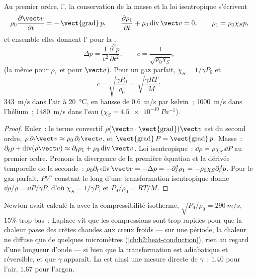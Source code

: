 \begin{theorem}\label{thm:b2:sound-waves:equation}
Au premier ordre, l', la conservation de la masse et la loi
isentropique s'écrivent
\[
\rho_0\frac{\partial\vect v}{\partial t} = -\operatorname{\vect{grad}}p , \qquad
\frac{\partial\rho_1}{\partial t} + \rho_0\operatorname{div}\vect v = 0 , \qquad
\rho_1 = \rho_0\chi_Sp ,
\]
et ensemble elles donnent l' pour la ,
\[
\Delta p = \frac1{c^2}\frac{\partial^2p}{\partial t^2} , \qquad
c = \frac1{\sqrt{\rho_0\chi_S}} ,
\]
(la même pour $\rho_1$ et pour $\vect v$). Pour un gaz parfait, $\chi_S =
1/\gamma P_0$ et
\[
c = \sqrt{\frac{\gamma P_0}{\rho_0}} = \sqrt{\frac{\gamma RT}{M}} :
\]
\qty{343}{m/s} dans l'air à \qty{20}{\degreeCelsius}, en hausse de \qty{0.6}{m/s}
par kelvin~; \qty{1000}{m/s} dans l'hélium~; \qty{1480}{m/s} dans l'eau ($\chi_S =
\qty{4.5e-10}{Pa^{-1}}$).
\end{theorem}

\begin{proof}
Euler~: le terme convectif $\rho(\vect v\cdot\operatorname{\vect{grad}})\vect v$
est du second ordre, $\rho\,\partial_t\vect v \approx \rho_0\,\partial_t\vect v$, et
$\operatorname{\vect{grad}}P = \operatorname{\vect{grad}}p$. Masse~: $\partial_t\rho +
\operatorname{div}(\rho\vect v) \approx \partial_t\rho_1 + \rho_0\operatorname{div}\vect v$.
Loi isentropique~: $\dd\rho = \rho\chi_S\,\dd P$ au premier ordre. Prenons la
divergence de la première équation et la dérivée temporelle de la seconde~:
$\rho_0\partial_t\operatorname{div}\vect v = -\Delta p = -\partial_t^2\rho_1 = -\rho_0\chi_S
\partial_t^2p$. Pour le gaz parfait, $PV^\gamma$ constant le long d'une transformation
isentropique donne $\dd\rho/\rho = \dd P/\gamma P$, d'où $\chi_S = 1/\gamma P$,
et $P_0/\rho_0 = RT/M$.
\end{proof}

\begin{remark}\label{rem:b2:sound-waves:laplace}
Newton avait calculé la  avec la compressibilité isotherme,
$\sqrt{P_0/\rho_0} = \qty{290}{m/s}$, $15\%$ trop bas~; Laplace vit que les
compressions sont trop rapides pour que la chaleur passe des crêtes chaudes aux
creux froids --- sur une période, la chaleur ne diffuse que de quelques micromètres
(\cref{ch:b2:heat-conduction}), rien au regard d'une longueur d'onde ---
si bien que la transformation est adiabatique et réversible, et que $\gamma$ apparaît.
La  est ainsi une mesure directe de $\gamma$~: $1.40$ pour
l'air, $1.67$ pour l'argon.
\end{remark}


